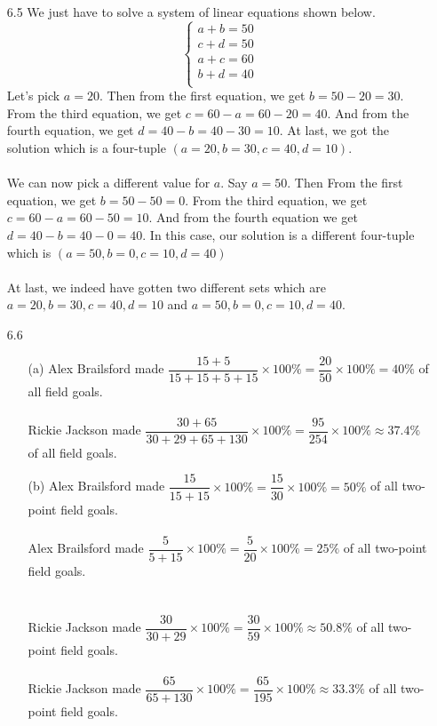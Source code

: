 \documentclass[11pt, a4paper]{article}
\begin{document}
\begin{itemize}
\item[6.5]
We just have to solve a system of linear equations shown below.
$$
\begin{cases}
a + b = 50\\
c + d = 50\\
a + c = 60\\
b + d = 40\\
\end{cases}
$$
Let's pick $a = 20$. Then from the first equation, we get $b = 50 - 20 = 30$.
From the third equation, we get $c = 60 - a = 60 - 20 = 40$. And from the fourth equation,
we get $d = 40 - b = 40 - 30 = 10$. At last, we got the solution which is a four-tuple
$(a = 20, b = 30, c = 40, d = 10)$.\\\\
We can now pick a different value for $a$. Say $a = 50$. Then From the first equation,
we get $b = 50 - 50 = 0$. From the third equation, we get $c = 60 - a = 60 - 50 = 10$.
And from the fourth equation we get $d = 40 - b = 40 - 0 = 40$. In this case, our solution
is a different four-tuple which is $(a = 50, b = 0, c = 10, d = 40)$\\\\
At last, we indeed have gotten two different sets which are $a = 20, b = 30, c = 40, d = 10$
and $a = 50, b = 0, c = 10, d = 40$.

\item[]
\item[]

\item[6.6]
\begin{itemize}
\item[(a)]
Alex Brailsford made $\dfrac{15 + 5}{15 + 15 + 5 + 15} \times 100\%= \dfrac{20}{50} \times 100\% = 40\%$ of all field goals.\\\\
Rickie Jackson made $\dfrac{30 + 65}{30 + 29 + 65 + 130} \times 100\%= \dfrac{95}{254} \times 100\% \approx 37.4\%$ of all field goals.

\item[]

\item[(b)]
Alex Brailsford made $\dfrac{15}{15 + 15} \times 100\%= \dfrac{15}{30} \times 100\% = 50\%$ of all two-point field goals.\\\\
Alex Brailsford made $\dfrac{5}{5 + 15} \times 100\%= \dfrac{5}{20} \times 100\% = 25\%$ of all two-point field goals.\\\\\\
Rickie Jackson made $\dfrac{30}{30 + 29} \times 100\%= \dfrac{30}{59} \times 100\% \approx 50.8\%$ of all two-point field goals.\\\\
Rickie Jackson made $\dfrac{65}{65 + 130} \times 100\%= \dfrac{65}{195} \times 100\% \approx 33.3\%$ of all two-point field goals.


\end{itemize}
\end{itemize}
\end{document}
